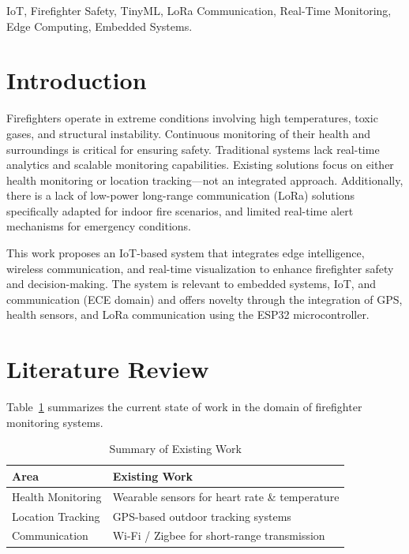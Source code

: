 \documentclass[conference]{IEEEtran}
\begin{document}
	\begin{IEEEkeywords}
		IoT, Firefighter Safety, TinyML, LoRa Communication, Real-Time Monitoring,
		Edge Computing, Embedded Systems.
	\end{IEEEkeywords}
	
	\section{Introduction}
	
	Firefighters operate in extreme conditions involving high temperatures, toxic
	gases, and structural instability. Continuous monitoring of their health and
	surroundings is critical for ensuring safety. Traditional systems lack real-time
	analytics and scalable monitoring capabilities. Existing solutions focus on
	either health monitoring or location tracking---not an integrated approach.
	Additionally, there is a lack of low-power long-range communication (LoRa)
	solutions specifically adapted for indoor fire scenarios, and limited real-time
	alert mechanisms for emergency conditions.
	
	This work proposes an IoT-based system that integrates edge intelligence,
	wireless communication, and real-time visualization to enhance firefighter
	safety and decision-making. The system is relevant to embedded systems, IoT,
	and communication (ECE domain) and offers novelty through the integration of
	GPS, health sensors, and LoRa communication using the ESP32 microcontroller.
	
	\section{Literature Review}
	
	Table~\ref{tab:existing_work} summarizes the current state of work in the
	domain of firefighter monitoring systems.
	
	\begin{table}[h]
		\caption{Summary of Existing Work}
		\label{tab:existing_work}
		\centering
		\begin{tabular}{|l|p{5cm}|}
			\hline
			\textbf{Area} & \textbf{Existing Work} \\
			\hline
			Health Monitoring  & Wearable sensors for heart rate \& temperature \\
			\hline
			Location Tracking  & GPS-based outdoor tracking systems \\
			\hline
			Communication      & Wi-Fi / Zigbee for short-range transmission \\
			\hline
		\end{tabular}
	\end{table}
	
\end{document}
